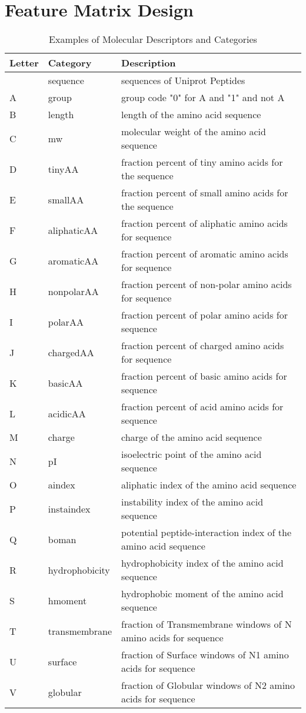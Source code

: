 \section{Feature Matrix Design}

\begin{table}[H]\tiny
 \caption{Examples of Molecular Descriptors and Categories }
\begin{tabular}{p{1cm}p{1cm}p{6cm}}
		\hline	
Letter & Category & Description \\
\hline
& sequence & sequences of Uniprot Peptides \\
A & group  & group code "0" for A and "1" and not A \\
B & length & length of the amino acid sequence \\
C & mw & molecular weight of the amino acid sequence \\
D & tinyAA & fraction percent of tiny amino acids for the sequence \\
E & smallAA & fraction percent of small amino acids for the sequence \\
F & aliphaticAA & fraction percent of aliphatic amino acids for sequence \\
G & aromaticAA & fraction percent of aromatic amino acids for sequence \\
H & nonpolarAA & fraction percent of non-polar amino acids for sequence \\
I & polarAA & fraction percent of polar amino acids for sequence \\
J & chargedAA & fraction percent of charged amino acids for sequence \\
K & basicAA & fraction percent of basic amino acids for sequence \\
L & acidicAA & fraction percent of acid amino acids for sequence \\
M & charge & charge of the amino acid sequence \\
N & pI & isoelectric point of the amino acid sequence \\
O & aindex & aliphatic index of the amino acid sequence \\
P & instaindex & instability index of the amino acid sequence \\
Q & boman & potential peptide-interaction index of the amino acid sequence \\
R & hydrophobicity & hydrophobicity index of the amino acid sequence \\
S & hmoment & hydrophobic moment of the amino acid sequence \\
T & transmembrane & fraction of Transmembrane windows of N amino acids for sequence \\
U & surface & fraction of Surface windows of N1 amino acids for sequence \\
V & globular & fraction of Globular windows of N2 amino acids for sequence \\
  \hline
\end{tabular}
\end{table}

